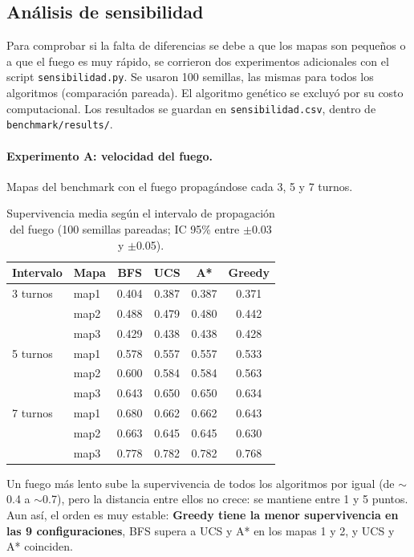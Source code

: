 \documentclass[11pt,a4paper]{article}
\begin{document}
\subsection{Análisis de sensibilidad}
\label{sec:sensibilidad}

Para comprobar si la falta de diferencias se debe a que los mapas son pequeños o a que el fuego es muy rápido, se corrieron dos experimentos adicionales con el script \texttt{sensibilidad.py}. Se usaron 100 semillas, las mismas para todos los algoritmos (comparación pareada). El algoritmo genético se excluyó por su costo computacional. Los resultados se guardan en \texttt{sensibilidad.csv}, dentro de \texttt{benchmark/results/}.

\paragraph{Experimento A: velocidad del fuego.} Mapas del benchmark con el fuego propagándose cada 3, 5 y 7 turnos.

\begin{table}[H]
\centering
\caption{Supervivencia media según el intervalo de propagación del fuego (100 semillas pareadas; IC 95\% entre $\pm$0.03 y $\pm$0.05).}
\label{tab:sens-fuego}
\begin{tabular}{llcccc}
\toprule
Intervalo & Mapa & BFS & UCS & A* & Greedy \\
\midrule
3 turnos & map1 & 0.404 & 0.387 & 0.387 & 0.371 \\
         & map2 & 0.488 & 0.479 & 0.480 & 0.442 \\
         & map3 & 0.429 & 0.438 & 0.438 & 0.428 \\
\midrule
5 turnos & map1 & 0.578 & 0.557 & 0.557 & 0.533 \\
         & map2 & 0.600 & 0.584 & 0.584 & 0.563 \\
         & map3 & 0.643 & 0.650 & 0.650 & 0.634 \\
\midrule
7 turnos & map1 & 0.680 & 0.662 & 0.662 & 0.643 \\
         & map2 & 0.663 & 0.645 & 0.645 & 0.630 \\
         & map3 & 0.778 & 0.782 & 0.782 & 0.768 \\
\bottomrule
\end{tabular}
\end{table}

Un fuego más lento sube la supervivencia de todos los algoritmos por igual (de $\sim$0.4 a $\sim$0.7), pero la distancia entre ellos no crece: se mantiene entre 1 y 5 puntos. Aun así, el orden es muy estable: \textbf{Greedy tiene la menor supervivencia en las 9 configuraciones}, BFS supera a UCS y A* en los mapas 1 y 2, y UCS y A* coinciden.
\end{document}
